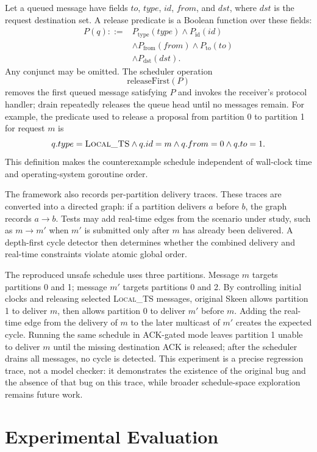 \documentclass[conference]{IEEEtran}
\begin{document}
Let a queued message have fields \(to\), \(type\), \(id\), \(from\), and \(dst\), where \(dst\) is the request destination set. A release predicate is a Boolean function over these fields:
\[
\begin{aligned}
P(q) ::= {}& P_{\mathrm{type}}(type) \wedge P_{\mathrm{id}}(id) \\
&\wedge P_{\mathrm{from}}(from) \wedge P_{\mathrm{to}}(to)\\
&\wedge P_{\mathrm{dst}}(dst).
\end{aligned}
\]
Any conjunct may be omitted. The scheduler operation
\[
\mathrm{releaseFirst}(P)
\]
removes the first queued message satisfying $P$ and invokes the receiver's protocol handler; \(\mathrm{drain}\) repeatedly releases the queue head until no messages remain. For example, the predicate used to release a proposal from partition 0 to partition 1 for request $m$ is
\[
q.type=\textsc{Local\_TS} \wedge q.id=m \wedge q.from=0 \wedge q.to=1.
\]
This definition makes the counterexample schedule independent of wall-clock time and operating-system goroutine order.

The framework also records per-partition delivery traces. These traces are converted into a directed graph: if a partition delivers $a$ before $b$, the graph records $a \rightarrow b$. Tests may add real-time edges from the scenario under study, such as $m \rightarrow m'$ when $m'$ is submitted only after $m$ has already been delivered. A depth-first cycle detector then determines whether the combined delivery and real-time constraints violate atomic global order.

The reproduced unsafe schedule uses three partitions. Message $m$ targets partitions 0 and 1; message $m'$ targets partitions 0 and 2. By controlling initial clocks and releasing selected \textsc{Local\_TS} messages, original Skeen allows partition 1 to deliver $m$, then allows partition 0 to deliver $m'$ before $m$. Adding the real-time edge from the delivery of $m$ to the later multicast of $m'$ creates the expected cycle. Running the same schedule in ACK-gated mode leaves partition 1 unable to deliver $m$ until the missing destination ACK is released; after the scheduler drains all messages, no cycle is detected. This experiment is a precise regression trace, not a model checker: it demonstrates the existence of the original bug and the absence of that bug on this trace, while broader schedule-space exploration remains future work.

\section{Experimental Evaluation}
\end{document}

